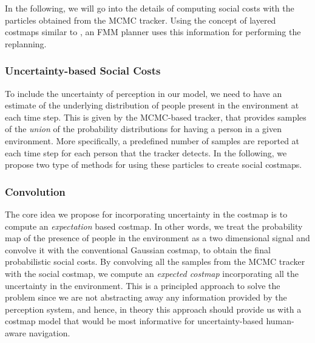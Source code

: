 In the following, we will go into the details of computing social costs with the particles obtained from the MCMC tracker. Using the concept of layered costmaps similar to \cite{lu2014iros}, an FMM planner uses this information for performing the replanning. 
\subsubsection{Uncertainty-based Social Costs}

To include the uncertainty of perception in our model, we need to have an estimate of the underlying distribution of people present in the environment at each time step. This is given by the MCMC-based tracker, that provides samples of the \textit{union} of the probability distributions for having a person in a given environment. More specifically, a predefined number of samples are reported at each time step for each person that the tracker detects. In the following, we propose two type of methods for using these particles to create social costmaps.  


\subsubsection*{Convolution}

The core idea we propose for incorporating uncertainty in the costmap is to compute an \textit{expectation} based costmap. In other words, we treat the probability map of the presence of people in the environment as a two dimensional signal and convolve it with the conventional Gaussian costmap, to obtain the final probabilistic social costs. By convolving all the samples from the MCMC tracker with the social costmap, we compute an \textit{expected costmap} incorporating all the uncertainty in the environment. This is a principled approach to solve the problem since we are not abstracting away any information provided by the perception system, and hence, in theory this approach should provide us with a costmap model that would be most informative for uncertainty-based human-aware navigation.



